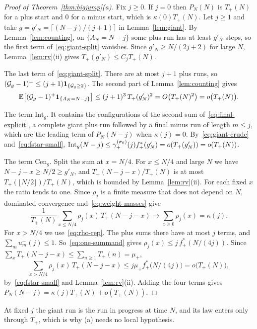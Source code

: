 \begin{proof}[Proof of Theorem~\ref{thm:bigjump}(a)]
Fix $j\ge0$. If $j=0$ then $P_N(N)$ is $T_\plus(N)$ for a plus start and $0$ for a
minus start, which is $\kappa(0)T_\plus(N)$. Let $j\ge1$ and take
$g=g'_N=\lceil(N-j)/(j+1)\rceil$ in Lemma~\ref{lem:giant}. By
Lemma~\ref{lem:counting}, on $\{A_N=N-j\}$ some plus run has at least $g'_N$ steps,
so the first term of~\eqref{eq:giant-split} vanishes. Since $g'_N\ge N/(2j+2)$ for
large $N$, Lemma~\ref{lem:rv}(ii) gives $T_\plus(g'_N)\le C_jT_\plus(N)$.

The last term of~\eqref{eq:giant-split}. There are at most $j+1$ plus runs, so
$(\mathcal G_g-1)^+\le(j+1)\mathbf{1}_{\{\mathcal G_g\ge2\}}$. The second part of
Lemma~\ref{lem:counting} gives
\[
 \mathbb{E}\bigl[(\mathcal G_g-1)^+\mathbf{1}_{\{A_N=N-j\}}\bigr]\le(j+1)^3\,T_{+}(g'_N)^2
 =O\bigl(T_{+}(N)^2\bigr)=o\bigl(T_{+}(N)\bigr).
\]

The term $\mathrm{Int}_g$. It contains the configurations of the second sum
of~\eqref{eq:final-explicit}, a complete giant plus run followed by a final minus
run of length $m\le j$, which are the leading term of $P_N(N-j)$ when $\kappa(j)=0$.
By~\eqref{eq:giant-crude} and~\eqref{eq:fstar-small},
$\mathrm{Int}_g(N-j)\le\gamma^{(\sigma_0)}_{+}(j)f^*_{+}(g'_N)=o(T_{+}(g'_N))=o(T_{+}(N))$.

The term $\mathrm{Cen}_g$. Split the sum at $x=N/4$. For $x\le N/4$ and large $N$ we
have $N-j-x\ge N/2\ge g'_N$, and $T_\plus(N-j-x)/T_\plus(N)$ is at most
$T_\plus(\lfloor N/2\rfloor)/T_\plus(N)$, which is bounded by Lemma~\ref{lem:rv}(ii).
For each fixed $x$ the ratio tends to one. Since $\rho_j$ is a finite measure that
does not depend on $N$, dominated convergence and~\eqref{eq:weight-masses} give
\[
 \frac1{T_\plus(N)}\sum_{x\le N/4}\rho_j(x)\,T_\plus(N-j-x)\to\sum_{x\ge0}\rho_j(x)=\kappa(j).
\]
For $x>N/4$ we use~\eqref{eq:rho-rep}. The plus sums there have at most $j$
terms, and $\sum_mu^\minus_m(j)\le1$. So~\eqref{eq:one-summand} gives
$\rho_j(x)\le j\,f^*_\plus(N/(4j))$. Since $\sum_{x}T_\plus(N-j-x)\le\sum_{n\ge1}T_\plus(n)=\mu_\plus$,
\[
 \sum_{x>N/4}\rho_j(x)\,T_\plus(N-j-x)\le j\mu_\plus f^*_\plus\bigl(N/(4j)\bigr)=o\bigl(T_\plus(N)\bigr),
\]
by~\eqref{eq:fstar-small} and Lemma~\ref{lem:rv}(ii). Adding the four terms gives
$P_N(N-j)=\kappa(j)T_\plus(N)+o(T_\plus(N))$.
\end{proof}

At fixed $j$ the giant run is the run in progress at time $N$, and its law enters only through $T_\plus$,
which is why (a) needs no local hypothesis.

